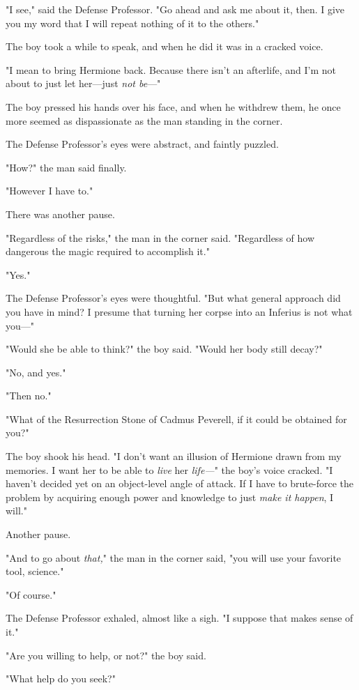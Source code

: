 "I see," said the Defense Professor. "Go ahead and ask me about it, then. I 
give you my word that I will repeat nothing of it to the others."

The boy took a while to speak, and when he did it was in a cracked voice.

"I mean to bring Hermione back. Because there isn't an afterlife, and I'm not 
about to just let her---just \emph{not be}---"

The boy pressed his hands over his face, and when he withdrew them, he once 
more seemed as dispassionate as the man standing in the corner.

The Defense Professor's eyes were abstract, and faintly puzzled.

"How?" the man said finally.

"However I have to."

There was another pause.

"Regardless of the risks," the man in the corner said. "Regardless of how 
dangerous the magic required to accomplish it."

"Yes."

The Defense Professor's eyes were thoughtful. "But what general approach did 
you have in mind? I presume that turning her corpse into an Inferius is not 
what you---"

"Would she be able to think?" the boy said. "Would her body still decay?"

"No, and yes."

"Then no."

"What of the Resurrection Stone of Cadmus Peverell, if it could be obtained for 
you?"

The boy shook his head. "I don't want an illusion of Hermione drawn from my 
memories. I want her to be able to \emph{live} her\emph{ life---}" the boy's 
voice cracked. "I haven't decided yet on an object-level angle of attack. If I 
have to brute-force the problem by acquiring enough power and knowledge to just 
\emph{make it happen}, I will."

Another pause.

"And to go about \emph{that,}" the man in the corner said, "you will use your 
favorite tool, science."

"Of course."

The Defense Professor exhaled, almost like a sigh. "I suppose that makes sense 
of it."

"Are you willing to help, or not?" the boy said.

"What help do you seek?"

